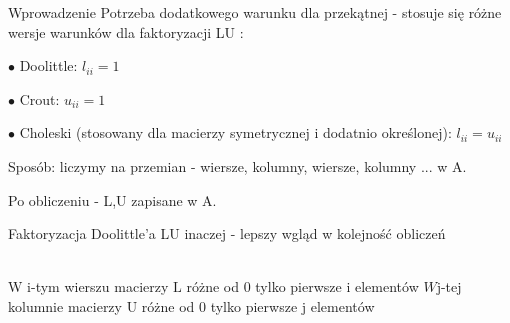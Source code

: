 \begin{frame}{Wprowadzenie}
Potrzeba dodatkowego warunku dla przekątnej -
stosuje się różne wersje warunków dla faktoryzacji LU :

$\bullet$ Doolittle: $l_{ii}=1$

$\bullet$ Crout: $u_{ii}=1$

$\bullet$ Choleski (stosowany dla macierzy symetrycznej i dodatnio określonej): $l_{ii}=u_{ii}$

\newline
\vspace{0.5 cm}

Sposób: liczymy na przemian - wiersze, kolumny, wiersze, kolumny ... w A.

Po obliczeniu - L,U zapisane w A.
\end{frame}

\begin{frame}{Faktoryzacja Doolittle'a}
LU inaczej - lepszy wgląd w kolejność obliczeń

\newline
\\
W $\mathrm{i}$-tym wierszu macierzy $\mathrm{L}$ różne od $0$ tylko pierwsze $\mathrm{i}$ element\'{o}w $W\mathrm{j}$-tej kolumnie macierzy $\mathrm{U}$ różne od $0$ tylko pierwsze $\mathrm{j}$ elementów

\end{frame}

